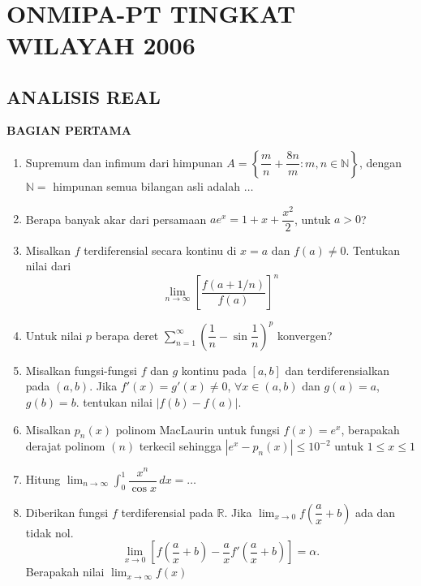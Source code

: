 \documentclass[12pt,twoside]{article}
\author{Firmansyah M.I.D}
\begin{document}
\makecoveronmipa
\nopagecolor
$~$
\thispagestyle{empty}
\pagebreak

\rhead{}
\tableofcontents
\pagebreak
\chead{}
\section{ONMIPA-PT TINGKAT WILAYAH 2006}
\subsection{ANALISIS REAL}

\textbf{BAGIAN PERTAMA}
\begin{enumerate}
	\item Supremum dan infimum dari himpunan $A=\left\lbrace\dfrac{m}{n}+\dfrac{8n}{m}:m,n\in \mathbb{N}\right\rbrace$, dengan $\mathbb{N}=$ himpunan semua bilangan asli adalah $\dots$
	\item Berapa banyak akar dari persamaan $ae^x=1+x+\dfrac{x^2}{2}$, untuk $a>0$?
	\item Misalkan $f$ terdiferensial secara kontinu di $x=a$ dan $f(a)\neq 0$. Tentukan nilai dari $$\lim_{n\to \infty}\left[\dfrac{f(a+1/n)}{f(a)}\right]^n$$
	\item Untuk nilai $p$ berapa deret $\displaystyle \sum_{n=1}^{\infty}\left(\dfrac{1}{n}-\sin\dfrac{1}{n}\right)^p$ konvergen?

	\item Misalkan fungsi-fungsi $f$ dan $g$ kontinu pada $[a,b]$ dan terdiferensialkan pada $(a,b)$. Jika $f'(x)=g'(x)\neq 0$, $\forall x\in (a,b)$ dan $g(a)=a$, $g(b)=b$. tentukan nilai $|f(b)-f(a)|$.
	\item Misalkan $p_n(x)$ polinom MacLaurin untuk fungsi $f(x)=e^x$, berapakah derajat polinom $(n)$ terkecil sehingga $|e^x-p_n(x)|\leq 10^{-2}$ untuk $1\leq x
		      \leq 1$
	\item Hitung $\displaystyle \lim_
		      {n\to \infty}\int_{0}^{1}\dfrac{x^n}{\cos x}\,dx=\dots$
	\item Diberikan fungsi $f$ terdiferensial pada $\mathbb{R}$. Jika $\displaystyle\lim_{x\to 0}f\left(\dfrac{a}{x}+b\right)$ ada dan tidak nol.
	      $$\lim_{x\to
			      0}\left[f\left(\dfrac
			      {a}{x}+b\right)-\dfrac{a}{x}f'\left(\dfrac{a}{x}+b\right)\right]
		      =\alpha.$$
	      Berapakah nilai $\lim_{x\to \infty}f(x)$
\end{enumerate}
\end{document}
